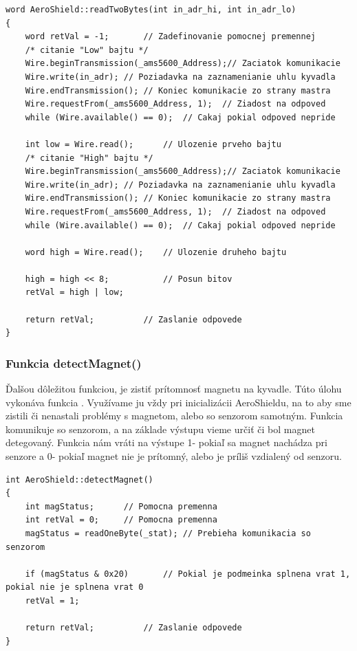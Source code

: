 \begin{lstlisting}[caption={Zdrojový kód funkcie readTwoBytes.},captionpos=b]
word AeroShield::readTwoBytes(int in_adr_hi, int in_adr_lo)        
{
	word retVal = -1;		// Zadefinovanie pomocnej premennej
	/* citanie "Low" bajtu */
	Wire.beginTransmission(_ams5600_Address);// Zaciatok komunikacie 
	Wire.write(in_adr);	// Poziadavka na zaznamenianie uhlu kyvadla 
	Wire.endTransmission();	// Koniec komunikacie zo strany mastra
	Wire.requestFrom(_ams5600_Address, 1);	// Ziadost na odpoved  
	while (Wire.available() == 0);	// Cakaj pokial odpoved nepride  

	int low = Wire.read();     	// Ulozenie prveho bajtu 
	/* citanie "High" bajtu */
	Wire.beginTransmission(_ams5600_Address);// Zaciatok komunikacie 
	Wire.write(in_adr);	// Poziadavka na zaznamenianie uhlu kyvadla 
	Wire.endTransmission();	// Koniec komunikacie zo strany mastra
	Wire.requestFrom(_ams5600_Address, 1);	// Ziadost na odpoved  
	while (Wire.available() == 0);	// Cakaj pokial odpoved nepride  
	
	word high = Wire.read();   	// Ulozenie druheho bajtu 
	
	high = high << 8;          	// Posun bitov
	retVal = high | low;
	
	return retVal;	   	  	// Zaslanie odpovede 
}
\end{lstlisting}

\subsubsection{Funkcia detectMagnet()}

Ďalšou dôležitou funkciou, je zistiť prítomnosť magnetu na kyvadle. Túto úlohu vykonáva funkcia . Využívame ju vždy pri inicializácii AeroShieldu, na to aby sme zistili či nenastali problémy s magnetom, alebo so senzorom samotným. Funkcia komunikuje so senzorom, a na základe výstupu vieme určiť či bol magnet detegovaný. Funkcia nám vráti na výstupe 1- pokiaľ sa magnet nachádza pri senzore a 0- pokiaľ magnet nie je prítomný, alebo je príliš vzdialený od senzoru. 

\begin{lstlisting}[caption={Zdrojový kód funkcie detectMagnet.},captionpos=b]
int AeroShield::detectMagnet() 
{
	int magStatus;		// Pomocna premenna  
	int retVal = 0;		// Pomocna premenna
	magStatus = readOneByte(_stat);	// Prebieha komunikacia so senzorom                        
	
	if (magStatus & 0x20)		// Pokial je podmeinka splnena vrat 1, pokial nie je splnena vrat 0 
	retVal = 1;
	
	return retVal;			// Zaslanie odpovede 
}
\end{lstlisting}

